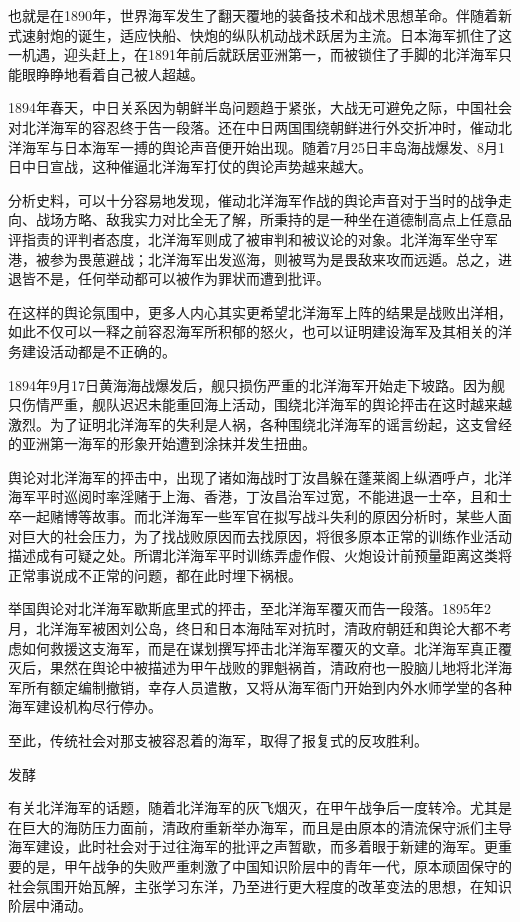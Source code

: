 \documentclass[12pt,UTF8]{ctexbook}
\begin{document}
也就是在1890年，世界海军发生了翻天覆地的装备技术和战术思想革命。伴随着新式速射炮的诞生，适应快船、快炮的纵队机动战术跃居为主流。日本海军抓住了这一机遇，迎头赶上，在1891年前后就跃居亚洲第一，而被锁住了手脚的北洋海军只能眼睁睁地看着自己被人超越。

1894年春天，中日关系因为朝鲜半岛问题趋于紧张，大战无可避免之际，中国社会对北洋海军的容忍终于告一段落。还在中日两国围绕朝鲜进行外交折冲时，催动北洋海军与日本海军一搏的舆论声音便开始出现。随着7月25日丰岛海战爆发、8月1日中日宣战，这种催逼北洋海军打仗的舆论声势越来越大。

分析史料，可以十分容易地发现，催动北洋海军作战的舆论声音对于当时的战争走向、战场方略、敌我实力对比全无了解，所秉持的是一种坐在道德制高点上任意品评指责的评判者态度，北洋海军则成了被审判和被议论的对象。北洋海军坐守军港，被参为畏葸避战；北洋海军出发巡海，则被骂为是畏敌来攻而远遁。总之，进退皆不是，任何举动都可以被作为罪状而遭到批评。

在这样的舆论氛围中，更多人内心其实更希望北洋海军上阵的结果是战败出洋相，如此不仅可以一释之前容忍海军所积郁的怒火，也可以证明建设海军及其相关的洋务建设活动都是不正确的。

1894年9月17日黄海海战爆发后，舰只损伤严重的北洋海军开始走下坡路。因为舰只伤情严重，舰队迟迟未能重回海上活动，围绕北洋海军的舆论抨击在这时越来越激烈。为了证明北洋海军的失利是人祸，各种围绕北洋海军的谣言纷起，这支曾经的亚洲第一海军的形象开始遭到涂抹并发生扭曲。

舆论对北洋海军的抨击中，出现了诸如海战时丁汝昌躲在蓬莱阁上纵酒呼卢，北洋海军平时巡阅时率淫赌于上海、香港，丁汝昌治军过宽，不能进退一士卒，且和士卒一起赌博等故事。而北洋海军一些军官在拟写战斗失利的原因分析时，某些人面对巨大的社会压力，为了找战败原因而去找原因，将很多原本正常的训练作业活动描述成有可疑之处。所谓北洋海军平时训练弄虚作假、火炮设计前预量距离这类将正常事说成不正常的问题，都在此时埋下祸根。

举国舆论对北洋海军歇斯底里式的抨击，至北洋海军覆灭而告一段落。1895年2月，北洋海军被困刘公岛，终日和日本海陆军对抗时，清政府朝廷和舆论大都不考虑如何救援这支海军，而是在谋划撰写抨击北洋海军覆灭的文章。北洋海军真正覆灭后，果然在舆论中被描述为甲午战败的罪魁祸首，清政府也一股脑儿地将北洋海军所有额定编制撤销，幸存人员遣散，又将从海军衙门开始到内外水师学堂的各种海军建设机构尽行停办。

至此，传统社会对那支被容忍着的海军，取得了报复式的反攻胜利。

发酵

有关北洋海军的话题，随着北洋海军的灰飞烟灭，在甲午战争后一度转冷。尤其是在巨大的海防压力面前，清政府重新举办海军，而且是由原本的清流保守派们主导海军建设，此时社会对于过往海军的批评之声暂歇，而多着眼于新建的海军。更重要的是，甲午战争的失败严重刺激了中国知识阶层中的青年一代，原本顽固保守的社会氛围开始瓦解，主张学习东洋，乃至进行更大程度的改革变法的思想，在知识阶层中涌动。
\end{document}

